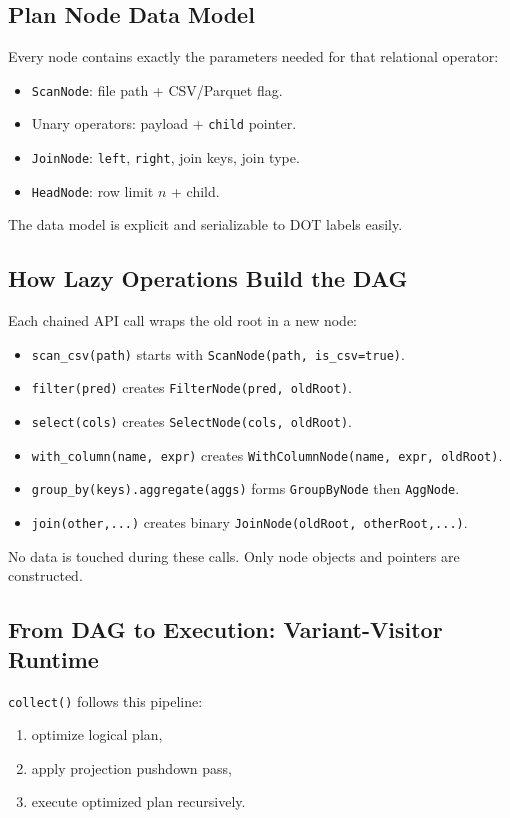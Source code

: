\documentclass[11pt,a4paper]{article}
\begin{document}
\subsection{Plan Node Data Model}
Every node contains exactly the parameters needed for that relational operator:
\begin{itemize}[leftmargin=*]
	\item \texttt{ScanNode}: file path + CSV/Parquet flag.
	\item Unary operators: payload + \texttt{child} pointer.
	\item \texttt{JoinNode}: \texttt{left}, \texttt{right}, join keys, join type.
	\item \texttt{HeadNode}: row limit \(n\) + child.
\end{itemize}
The data model is explicit and serializable to DOT labels easily.

\subsection{How Lazy Operations Build the DAG}
Each chained API call wraps the old root in a new node:
\begin{itemize}[leftmargin=*]
	\item \texttt{scan\_csv(path)} starts with \texttt{ScanNode(path, is\_csv=true)}.
	\item \texttt{filter(pred)} creates \texttt{FilterNode(pred, oldRoot)}.
	\item \texttt{select(cols)} creates \texttt{SelectNode(cols, oldRoot)}.
	\item \texttt{with\_column(name, expr)} creates \texttt{WithColumnNode(name, expr, oldRoot)}.
	\item \texttt{group\_by(keys).aggregate(aggs)} forms \texttt{GroupByNode} then \texttt{AggNode}.
	\item \texttt{join(other,...)} creates binary \texttt{JoinNode(oldRoot, otherRoot,...)}.
\end{itemize}
No data is touched during these calls. Only node objects and pointers are constructed.

\subsection{From DAG to Execution: Variant-Visitor Runtime}
\texttt{collect()} follows this pipeline:
\begin{enumerate}[leftmargin=*]
	\item optimize logical plan,
	\item apply projection pushdown pass,
	\item execute optimized plan recursively.
\end{enumerate}
\end{document}
